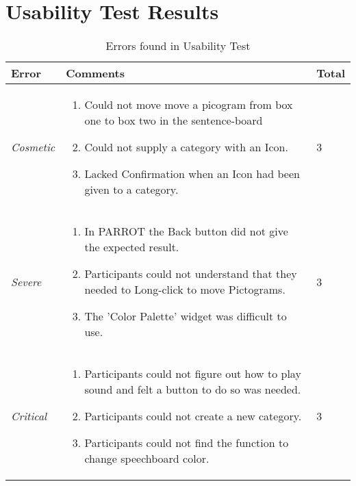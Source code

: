 \section{Usability Test Results}
\label{sec:UseTestRes}

\begin{table}
	\centering
		\begin{tabular}{l | l | l}
		\hline
			\textbf{Error} & \textbf{Comments} & Total\\
		\hline
			\textit{Cosmetic} & \begin{enumerate} 
														\item Could not move move a picogram from box one to box two in the sentence-board
														\item Could not supply a category with an Icon.
														\item Lacked Confirmation when an Icon had been given to a category.
													\end{enumerate} & 3 \\
		\hline
			\textit{Severe} & \begin{enumerate}
													\item In PARROT the Back button did not give the expected result.
													\item Participants could not understand that they needed to Long-click to move Pictograms.
													\item The 'Color Palette' widget was difficult to use.
												\end{enumerate} & 3 \\
		\hline
			\textit{Critical} & \begin{enumerate}
														\item Participants could not figure out how to play sound and felt a button to do so was needed.
														\item Participants could not create a new category.
														\item Participants could not find the function to change speechboard color.
													\end{enumerate} & 3 \\
		\hline
		\end{tabular}
	\caption{Errors found in Usability Test}
	\label{tab:ErrorsFoundInUsabilityTest}
\end{table}